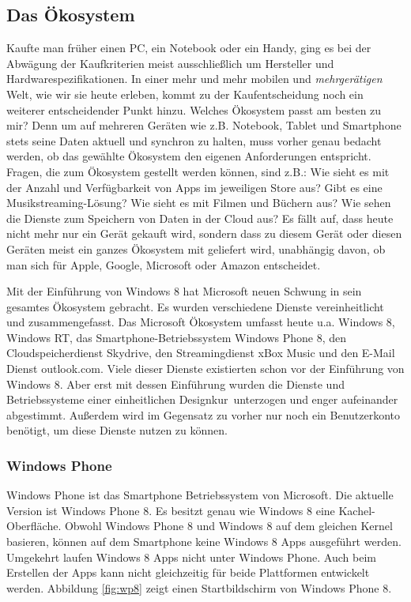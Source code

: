 \documentclass[12pt,a4paper,bibtotoc,abstracton]{scrartcl}
\begin{document}
\subsection{Das Ökosystem}
\label{subsec:ökosystem}
Kaufte man früher einen PC, ein Notebook oder ein Handy, ging es bei der Abwägung der Kaufkriterien meist ausschließlich um Hersteller und Hardwarespezifikationen. In einer mehr und mehr mobilen und \textit{mehrgerätigen} Welt, wie wir sie heute erleben, kommt zu der Kaufentscheidung noch ein weiterer entscheidender Punkt hinzu. Welches Ökosystem passt am besten zu mir? Denn um auf mehreren Geräten wie z.B. Notebook, Tablet und Smartphone stets seine Daten aktuell und synchron zu halten, muss vorher genau bedacht werden, ob das gewählte Ökosystem den eigenen Anforderungen entspricht. Fragen, die zum  Ökosystem gestellt werden können, sind z.B.: Wie sieht es mit der Anzahl und Verfügbarkeit von Apps im jeweiligen Store aus? Gibt es eine Musikstreaming-Lösung? Wie sieht es mit Filmen und Büchern aus? Wie sehen die Dienste zum Speichern von Daten in der Cloud aus? Es fällt auf, dass heute nicht mehr nur ein Gerät gekauft wird, sondern dass zu diesem Gerät oder diesen Geräten meist ein ganzes Ökosystem mit geliefert wird, unabhängig davon, ob man sich für Apple, Google, Microsoft oder Amazon entscheidet. 

Mit der Einführung von Windows 8 hat Microsoft neuen Schwung in sein gesamtes Ökosystem gebracht. Es wurden verschiedene Dienste vereinheitlicht und zusammengefasst. Das Microsoft Ökosystem umfasst heute u.a. Windows 8, Windows RT, das Smartphone-Betriebssystem Windows Phone 8, den Cloudspeicherdienst Skydrive, den Streamingdienst xBox Music und den E-Mail Dienst outlook.com. Viele dieser Dienste existierten schon vor der Einführung von Windows 8. Aber erst mit dessen Einführung wurden die Dienste und Betriebssysteme einer einheitlichen \glqq Designkur\grqq\ unterzogen und enger aufeinander abgestimmt. Außerdem wird im Gegensatz zu vorher nur noch ein Benutzerkonto benötigt, um diese Dienste nutzen zu können.

\subsubsection{Windows Phone}
\label{subsubsec:windowsphone}
Windows Phone ist das Smartphone Betriebssystem von Microsoft. Die aktuelle Version ist Windows Phone 8. Es besitzt genau wie Windows 8 eine Kachel-Oberfläche. Obwohl Windows Phone 8 und Windows 8 auf dem gleichen Kernel basieren, können auf dem Smartphone keine Windows 8 Apps ausgeführt werden. Umgekehrt laufen Windows 8 Apps nicht unter Windows Phone. Auch beim Erstellen der Apps kann nicht gleichzeitig für beide Plattformen entwickelt werden. Abbildung \ref{fig:wp8} zeigt einen Startbildschirm von Windows Phone 8.
\end{document}
